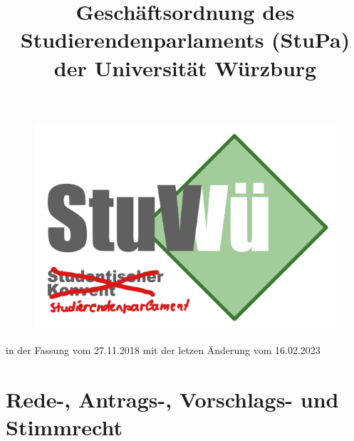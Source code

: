 \documentclass[10pt,a4paper]{scrartcl}
\title{\LARGE Geschäftsordnung des Studierendenparlaments (StuPa) der Universität Würzburg}
\date{}
\begin{document}
\maketitle

\begin{figure}[h]
	\includegraphics[width=\textwidth]{logo.png}
\end{figure}


\vspace{2cm}

{\centering \Large \sffamily in der Fassung vom 27.11.2018 mit der letzen Änderung
vom 16.02.2023}

\pagebreak

\setcounter{tocdepth}{4}
\tableofcontents

\pagebreak


\section{Rede-, Antrags-, Vorschlags- und
Stimmrecht}\label{rede--antrags--vorschlags--und-stimmrecht}
\end{document}
